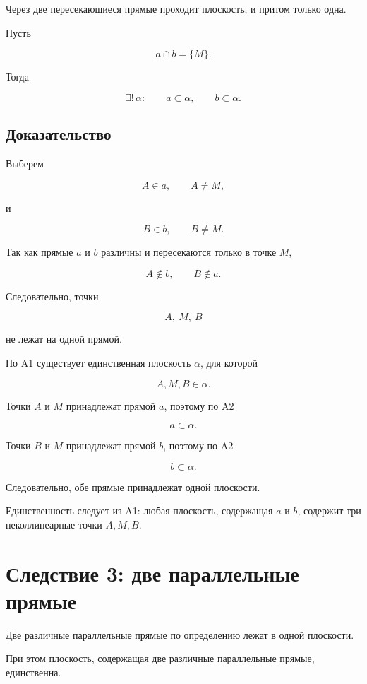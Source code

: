 \documentclass[a4paper,12pt]{article}
\begin{document}
Через две пересекающиеся прямые проходит плоскость,
и притом только одна.

Пусть

\[
a\cap b=\{M\}.
\]

Тогда

\[
\boxed{
\exists!\,\alpha:
\qquad
a\subset\alpha,
\qquad
b\subset\alpha.
}
\]


\subsection{Доказательство}

Выберем

\[
A\in a,\qquad A\ne M,
\]

и

\[
B\in b,\qquad B\ne M.
\]

Так как прямые \(a\) и \(b\) различны и пересекаются только в точке \(M\),

\[
A\notin b,
\qquad
B\notin a.
\]

Следовательно, точки

\[
A,\ M,\ B
\]

не лежат на одной прямой.

По A1 существует единственная плоскость \(\alpha\), для которой

\[
A,M,B\in\alpha.
\]

Точки \(A\) и \(M\) принадлежат прямой \(a\), поэтому по A2

\[
a\subset\alpha.
\]

Точки \(B\) и \(M\) принадлежат прямой \(b\), поэтому по A2

\[
b\subset\alpha.
\]

Следовательно, обе прямые принадлежат одной плоскости.

Единственность следует из A1:
любая плоскость, содержащая \(a\) и \(b\),
содержит три неколлинеарные точки \(A,M,B\).


\section{Следствие 3: две параллельные прямые}

Две различные параллельные прямые по определению лежат
в одной плоскости.

При этом плоскость, содержащая две различные параллельные прямые,
единственна.
\end{document}
